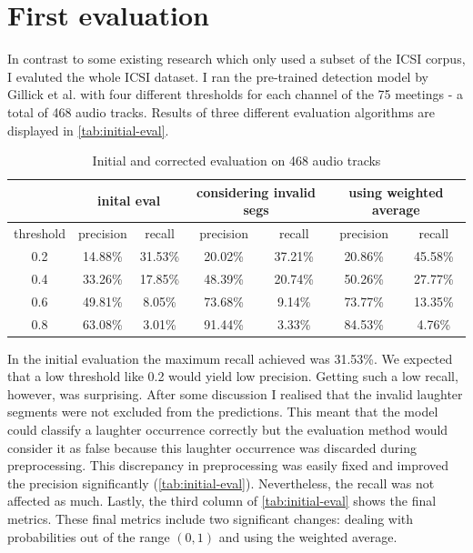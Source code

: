 \documentclass[bsc,frontabs,parskip,deptreport]{infthesis}
\begin{document}
\section{First evaluation}
In contrast to some existing research \citep{kennedy2004laughter, knox2006automatic} which only used a subset of the ICSI corpus, I evaluted the whole ICSI dataset.
I ran the pre-trained detection model by Gillick et al. with four different thresholds for each channel of the 75 meetings - a total of 468 audio tracks. 
Results of three different evaluation algorithms are displayed in \autoref{tab:initial-eval}.

\begin{table}[]
    \centering
    \begin{tabular}{|c|c|c|c|c|c|c|}
    \hline
    & \multicolumn{2}{|c|}{inital eval} & \multicolumn{2}{|c|}{considering invalid segs} & \multicolumn{2}{|c|}{using weighted average}  \\
    \hline 
    threshold & precision & recall & precision & recall & precision & recall  \\
    \hline
        0.2 &  14.88\% & 31.53\% & 20.02\% & 37.21\%  & 20.86\% & 45.58\%\\
        0.4 &  33.26\% & 17.85\% & 48.39\% & 20.74\%  & 50.26\% & 27.77\%\\
        0.6 &  49.81\% & 8.05\% & 73.68\% & 9.14\%    & 73.77\% & 13.35\% \\
        0.8 &  63.08\% & 3.01\% & 91.44\% & 3.33\%    & 84.53\% & 4.76\% \\
     \hline
    \end{tabular}
    \caption{Initial and corrected evaluation on 468 audio tracks}
    \label{tab:initial-eval}
\end{table}


In the initial evaluation the maximum recall achieved was 31.53\%. We expected that a low threshold like 0.2 would yield low precision. Getting such a low recall, however, was surprising. 
After some discussion I realised that the invalid laughter segments were not excluded from the predictions. This meant that the model could classify a laughter occurrence correctly but the evaluation method would consider it as false because this laughter occurrence was discarded during preprocessing. This discrepancy in preprocessing was easily fixed and improved the precision significantly (\autoref{tab:initial-eval}). Nevertheless, the recall was not affected as much. 
Lastly, the third column of \autoref{tab:initial-eval} shows the final metrics. 
These final metrics include two significant changes: dealing with probabilities out of the range $(0,1)$ and using the weighted average. 
\end{document}
